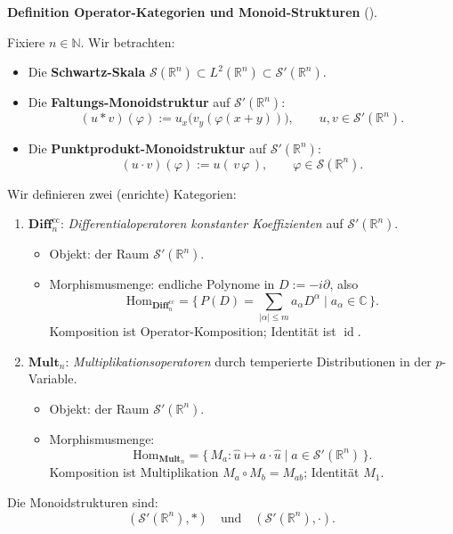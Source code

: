 \documentclass[10pt, letterpaper]{article}
\newcommand{\id}{\operatorname{id}}
\newcommand{\R}{\mathbb{R}}
\newcommand{\N}{\mathbb{N}}
\newcommand{\C}{\mathbb{C}}
\newcommand{\Hom}{\mathrm{Hom}}
\newcommand{\CustomHeading}[3]{%
  \par\medskip\noindent%
  \textbf{#1 #2} \textnormal{(#3)}.\enskip%
}
\newenvironment{DEF}[2]{\begin{unitbox}\CustomHeading{Definition}{#1}{#2}}{\end{unitbox}}
\begin{document}
\begin{DEF}{Operator-Kategorien und Monoid-Strukturen}{}
Fixiere $n\in\N$. Wir betrachten:
\begin{itemize}
\item Die \textbf{Schwartz-Skala} $\mathcal{S}(\R^n)\subset L^2(\R^n)\subset\mathcal{S}'(\R^n)$.
\item Die \textbf{Faltungs-Monoidstruktur} auf $\mathcal{S}'(\R^n)$:
\[
(u*v)(\varphi):=u_x\big(v_y(\varphi(x+y))\big),\qquad u,v\in\mathcal{S}'(\R^n).
\]
\item Die \textbf{Punktprodukt-Monoidstruktur} auf $\mathcal{S}'(\R^n)$:
\[
(u\cdot v)(\varphi):=u(\,v\,\varphi\,),\qquad \varphi\in\mathcal{S}(\R^n).
\]
\end{itemize}
\medskip
Wir definieren zwei (enrichte) Kategorien:
\begin{enumerate}
\item $\mathbf{Diff}^{\mathrm{cc}}_n$: \emph{Differentialoperatoren konstanter Koeffizienten} auf $\mathcal{S}'(\R^n)$.
\begin{itemize}
\item Objekt: der Raum $\mathcal{S}'(\R^n)$.
\item Morphismusmenge: endliche Polynome in $D:=-i\partial$, also
\[
\Hom_{\mathbf{Diff}^{\mathrm{cc}}_n}=\{\,P(D)=\sum_{|\alpha|\le m}a_\alpha D^\alpha\mid a_\alpha\in\C\,\}.
\]
Komposition ist Operator-Komposition; Identität ist $\id$.
\end{itemize}

\item $\mathbf{Mult}_n$: \emph{Multiplikationsoperatoren} durch temperierte Distributionen in der $p$-Variable.
\begin{itemize}
\item Objekt: der Raum $\mathcal{S}'(\R^n)$.
\item Morphismusmenge:
\[
\Hom_{\mathbf{Mult}_n}=\{\,M_a: \hat u\mapsto a\cdot \hat u\mid a\in\mathcal{S}'(\R^n)\,\}.
\]
Komposition ist Multiplikation $M_a\circ M_b=M_{ab}$; Identität $M_1$.
\end{itemize}
\end{enumerate}
Die Monoidstrukturen sind:
\[
(\mathcal{S}'(\R^n),*)\quad\text{und}\quad(\mathcal{S}'(\R^n),\cdot).
\]
\end{DEF}


\end{document}
